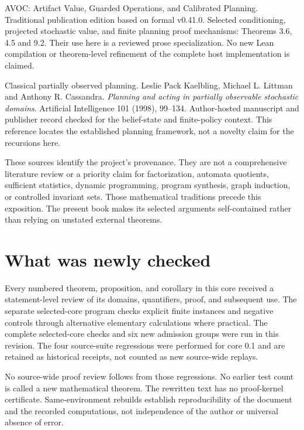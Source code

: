 \documentclass[11pt,oneside,openany]{book}
\theoremstyle{definition}\newtheorem{definition}[theorem]{Definition}
\begin{document}
\begin{description}[style=nextline]
\item[AVOC] AVOC: Artifact Value, Guarded Operations, and Calibrated Planning.
Traditional publication edition based on formal v0.41.0. Selected conditioning, projected stochastic value, and finite planning proof mechanisms: Theorems 3.6, 4.5 and 9.2. Their use here is a reviewed prose specialization. No new Lean compilation or theorem-level refinement of the complete host implementation is claimed.

\item[KLC] Classical partially observed planning.
Leslie Pack Kaelbling, Michael L. Littman and Anthony R. Cassandra. \emph{Planning and acting in partially observable stochastic domains}. Artificial Intelligence 101 (1998), 99--134. Author-hosted manuscript and publisher record checked for the belief-state and finite-policy context. This reference locates the established planning framework, not a novelty claim for the recursions here.


\end{description}

These sources identify the project's provenance. They are not a comprehensive literature review or a priority claim for factorization, automata quotients, sufficient statistics, dynamic programming, program synthesis, graph induction, or controlled invariant sets. Those mathematical traditions precede this exposition. The present book makes its selected arguments self-contained rather than relying on unstated external theorems.

\section*{What was newly checked}
Every numbered theorem, proposition, and corollary in this core received a statement-level review of its domains, quantifiers, proof, and subsequent use. The separate selected-core program checks explicit finite instances and negative controls through alternative elementary calculations where practical. The complete selected-core checks and six new admission groups were run in this revision. The four source-suite regressions were performed for core 0.1 and are retained as historical receipts, not counted as new source-wide replays.

No source-wide proof review follows from those regressions. No earlier test count is called a new mathematical theorem. The rewritten text has no proof-kernel certificate. Same-environment rebuilds establish reproducibility of the document and the recorded computations, not independence of the author or universal absence of error.
\end{document}
